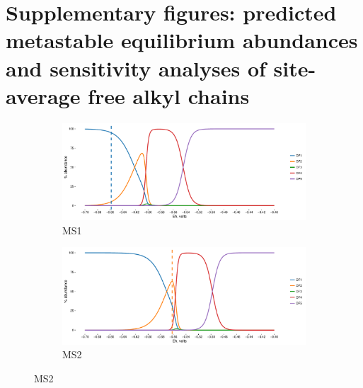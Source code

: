 \chapter{Supplementary figures: predicted metastable equilibrium abundances and sensitivity analyses of site-average free alkyl chains}

\begin{figure}[h]
\centering

    \begin{subfigure}[b]{\linewidth}
       	\includegraphics[width=1\linewidth]{"figs_app2/Mound OF1_thermo"}
       	\caption{MS1}
        \label{fig:MS1_thermo}
    \end{subfigure}
    \begin{subfigure}[b]{\linewidth}
    	\includegraphics[width=1\linewidth]{"figs_app2/Mound OF2_thermo"}
    	\caption{MS2}
        \label{fig:MS2_thermo}
    \end{subfigure}
    
\end{figure}

\newpage


